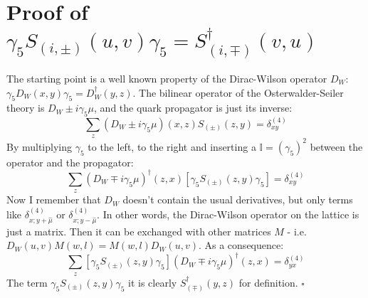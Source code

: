 \documentclass[english, LaM, oneside, noexaminfo]{sapthesis}
\newcommand{\proved}{\newline \hspace*{.97\textwidth} $\square$}
\begin{document}
\section{Proof of $\gamma_5 S_{(i,\pm)} (u,v) \gamma_5 = S_{(i,\mp)}^\dag (v,u)$}\label{app:proof-G5-DW}
\noindent
The starting point is a well known property of the Dirac-Wilson operator $D_W$: $\gamma_5 D_W(x,y) \gamma_5 = D_W^\dag(y,z)$.
The bilinear operator of the Osterwalder-Seiler theory is $D_W \pm i\gamma_5 \mu$, and the quark propagator is just its inverse:
\begin{equation*}
    \sum_z \left(D_W \pm i\gamma_5 \mu\right) (x,z) S_{(\pm)} (z,y) = \delta^{(4)}_{xy}
\end{equation*}
By multiplying $\gamma_5$ to the left, to the right and inserting a $\mathbb{I} = (\gamma_5)^2$ between the operator and the propagator:
\begin{equation*}
    \sum_z \left( D_W \mp i\gamma_5 \mu \right)^\dag (z,x) \left[\gamma_5 S_{(\pm)} (z,y) \gamma_5\right] = \delta^{(4)}_{xy}
\end{equation*}
Now I remember that $D_W$ doesn't contain the usual derivatives, but only terms like $\delta^{(4)}_{x;y+\hat\mu}$ or $\delta^{(4)}_{x;y-\hat\mu}$.
In other words, the Dirac-Wilson operator on the lattice is just a matrix.
Then it can be exchanged with other matrices $M$ - i.e. $D_W (u,v) M(w,l) = M(w,l) D_W (u,v)$.
As a consequence:
\begin{equation*}
    \sum_z \left[\gamma_5 S_{(\pm)} (z,y) \gamma_5\right] \left( D_W \mp i\gamma_5 \mu \right)^\dag (z,x) = \delta^{(4)}_{yx}
\end{equation*}
The term $\gamma_5 S_{(\pm)} (z,y) \gamma_5$ it is clearly $S_{(\mp)}^\dag (y,z)$ for definition.
\proved
\end{document}
